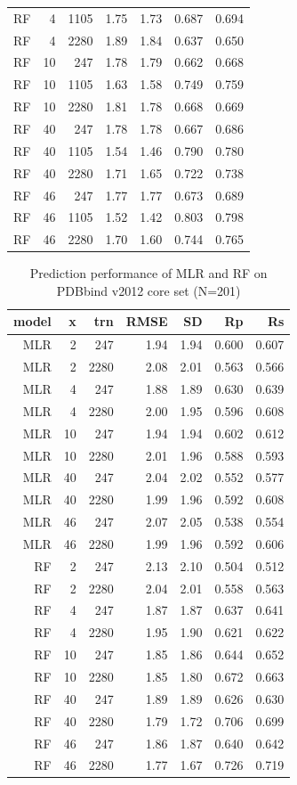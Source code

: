 \documentclass[journal=jacsat,manuscript=article]{achemso}
\begin{document}
\begin{table}
\begin{tabular}{rrrrrrr}
 RF &  4 & 1105 & 1.75 & 1.73 & 0.687 & 0.694\\
 RF &  4 & 2280 & 1.89 & 1.84 & 0.637 & 0.650\\
 RF & 10 &  247 & 1.78 & 1.79 & 0.662 & 0.668\\
 RF & 10 & 1105 & 1.63 & 1.58 & 0.749 & 0.759\\
 RF & 10 & 2280 & 1.81 & 1.78 & 0.668 & 0.669\\
 RF & 40 &  247 & 1.78 & 1.78 & 0.667 & 0.686\\
 RF & 40 & 1105 & 1.54 & 1.46 & 0.790 & 0.780\\
 RF & 40 & 2280 & 1.71 & 1.65 & 0.722 & 0.738\\
 RF & 46 &  247 & 1.77 & 1.77 & 0.673 & 0.689\\
 RF & 46 & 1105 & 1.52 & 1.42 & 0.803 & 0.798\\
 RF & 46 & 2280 & 1.70 & 1.60 & 0.744 & 0.765\\
\hline
\end{tabular}
\end{table}

\begin{table}
\caption{Prediction performance of MLR and RF on PDBbind v2012 core set (N=201)}
\label{tbl:performance}
\begin{tabular}{rrrrrrr}
\hline
model & x & trn & RMSE & SD & Rp & Rs\\
\hline
MLR &  2 &  247 & 1.94 & 1.94 & 0.600 & 0.607\\
MLR &  2 & 2280 & 2.08 & 2.01 & 0.563 & 0.566\\
MLR &  4 &  247 & 1.88 & 1.89 & 0.630 & 0.639\\
MLR &  4 & 2280 & 2.00 & 1.95 & 0.596 & 0.608\\
MLR & 10 &  247 & 1.94 & 1.94 & 0.602 & 0.612\\
MLR & 10 & 2280 & 2.01 & 1.96 & 0.588 & 0.593\\
MLR & 40 &  247 & 2.04 & 2.02 & 0.552 & 0.577\\
MLR & 40 & 2280 & 1.99 & 1.96 & 0.592 & 0.608\\
MLR & 46 &  247 & 2.07 & 2.05 & 0.538 & 0.554\\
MLR & 46 & 2280 & 1.99 & 1.96 & 0.592 & 0.606\\
 RF &  2 &  247 & 2.13 & 2.10 & 0.504 & 0.512\\
 RF &  2 & 2280 & 2.04 & 2.01 & 0.558 & 0.563\\
 RF &  4 &  247 & 1.87 & 1.87 & 0.637 & 0.641\\
 RF &  4 & 2280 & 1.95 & 1.90 & 0.621 & 0.622\\
 RF & 10 &  247 & 1.85 & 1.86 & 0.644 & 0.652\\
 RF & 10 & 2280 & 1.85 & 1.80 & 0.672 & 0.663\\
 RF & 40 &  247 & 1.89 & 1.89 & 0.626 & 0.630\\
 RF & 40 & 2280 & 1.79 & 1.72 & 0.706 & 0.699\\
 RF & 46 &  247 & 1.86 & 1.87 & 0.640 & 0.642\\
 RF & 46 & 2280 & 1.77 & 1.67 & 0.726 & 0.719\\
\hline
\end{tabular}
\end{table}
\end{document}
